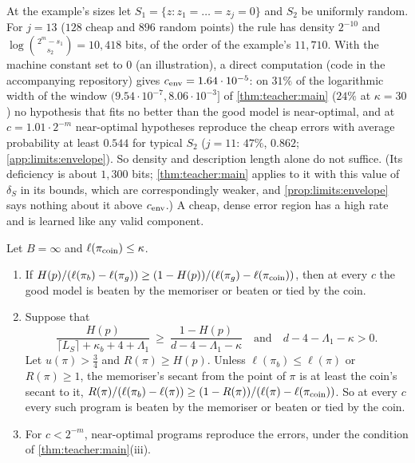 At the example's sizes let $S_1=\{z:z_1=\dots=z_j=0\}$ and $S_2$ be uniformly random. For $j=13$ ($128$ cheap and $896$ random points) the rule has density $2^{-10}$ and $\log\binom{2^m-s_1}{s_2}=10{,}418$ bits, of the order of the example's $11{,}710$. With the machine constant set to $0$ (an illustration), a direct computation (code in the accompanying repository) gives $c_{\rm env}=1.64\cdot10^{-5}$: on $31\%$ of the logarithmic width of the window $(9.54\cdot10^{-7},8.06\cdot10^{-3}]$ of \cref{thm:teacher:main} ($24\%$ at $\kappa=30$) no hypothesis that fits no better than the good model is near-optimal, and at $c=1.01\cdot2^{-m}$ near-optimal hypotheses reproduce the cheap errors with average probability at least $0.544$ for typical $S_2$ ($j=11$: $47\%$, $0.862$; \cref{app:limits:envelope}). So density and description length alone do not suffice. (Its deficiency is about $1{,}300$ bits; \cref{thm:teacher:main} applies to it with this value of $\delta_S$ in its bounds, which are correspondingly weaker, and \cref{prop:limits:envelope} says nothing about it above $c_{\rm env}$.) A cheap, dense error region has a high rate and is learned like any valid component.

\begin{proposition}\label{prop:limits:rateblind}
Let $B=\infty$ and $\ell(\pi_{\rm coin})\le\kappa$.
\begin{enumerate}[label=(\roman*),itemsep=0pt,topsep=2pt]
\item If $H(p)/(\ell(\pi_b)-\ell(\pi_g))\ge(1-H(p))/(\ell(\pi_g)-\ell(\pi_{\rm coin}))$, then at every $c$ the good model is beaten by the memoriser or beaten or tied by the coin.
\item Suppose that
\[
\frac{H(p)}{\lceil L_S\rceil+\kappa_b+4+\Lambda_1}\ \ge\ \frac{1-H(p)}{d-4-\Lambda_1-\kappa}\quad\text{and}\quad d-4-\Lambda_1-\kappa>0.\tag{$\star$}
\]
Let $u(\pi)>\frac34$ and $R(\pi)\ge H(p)$. Unless $\ell(\pi_b)\le\ell(\pi)$ or $R(\pi)\ge1$, the memoriser's secant from the point of $\pi$ is at least the coin's secant to it, $R(\pi)/(\ell(\pi_b)-\ell(\pi))\ge(1-R(\pi))/(\ell(\pi)-\ell(\pi_{\rm coin}))$. So at every $c$ every such program is beaten by the memoriser or beaten or tied by the coin.
\item For $c<2^{-m}$, near-optimal programs reproduce the errors, under the condition of \cref{thm:teacher:main}(iii).
\end{enumerate}
\end{proposition}


